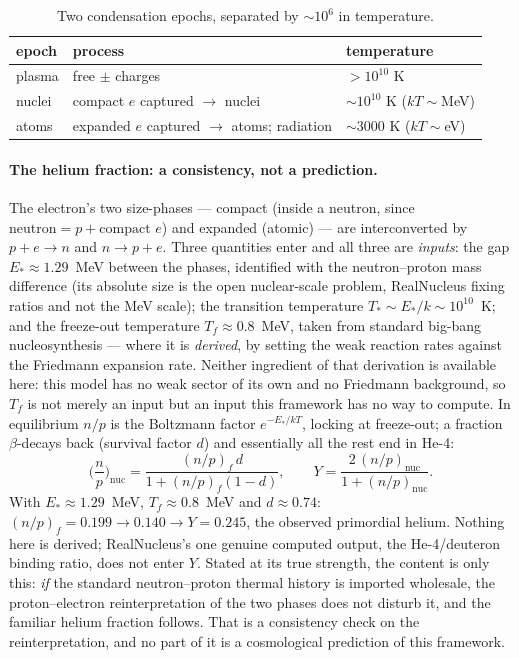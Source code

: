 \documentclass[11pt]{article}
\begin{document}
\begin{table}[h]\centering
\small
\begin{tabular}{@{}lll@{}}
\toprule
epoch & process & temperature \\
\midrule
plasma & free $\pm$ charges & $>10^{10}$ K \\
nuclei & compact $e$ captured $\to$ nuclei & ${\sim}10^{10}$ K ($kT{\sim}$MeV) \\
atoms & expanded $e$ captured $\to$ atoms; radiation & ${\sim}3000$ K ($kT{\sim}$eV) \\
\bottomrule
\end{tabular}
\caption{Two condensation epochs, separated by ${\sim}10^6$ in temperature.}\label{tab:epochs}
\end{table}

\paragraph{The helium fraction: a consistency, not a prediction.} The electron's two size-phases --- compact
(inside a neutron, since $\text{neutron}=p+\text{compact }e$) and expanded (atomic) --- are interconverted by
$p+e\to n$ and $n\to p+e$. Three quantities enter and all three are \emph{inputs}: the gap $E_\ast\approx1.29$~MeV
between the phases, identified with the neutron--proton mass difference (its absolute size is the open
nuclear-scale problem, RealNucleus fixing ratios and not the MeV scale); the transition temperature
$T_\ast\sim E_\ast/k\sim10^{10}$~K; and the freeze-out temperature $T_f\approx0.8$~MeV, taken from standard big-bang
nucleosynthesis --- where it is \emph{derived}, by setting the weak reaction rates against the Friedmann
expansion rate. Neither ingredient of that derivation is available here: this model has no weak sector of its own
and no Friedmann background, so $T_f$ is not merely an input but an input this framework has no way to compute. In equilibrium $n/p$ is the Boltzmann factor $e^{-E_\ast/kT}$, locking at freeze-out; a fraction
$\beta$-decays back (survival factor $d$) and essentially all the rest end in He-4:
\begin{equation}
\Big(\frac{n}{p}\Big)_{\text{nuc}}=\frac{(n/p)_f\,d}{1+(n/p)_f(1-d)},
\qquad
Y=\frac{2\,(n/p)_{\text{nuc}}}{1+(n/p)_{\text{nuc}}} .
\end{equation}
With $E_\ast\approx1.29$~MeV, $T_f\approx0.8$~MeV and $d\approx0.74$: $(n/p)_f=0.199\to0.140\to Y=0.245$, the
observed primordial helium. Nothing here is derived; RealNucleus's one genuine computed output, the He-4/deuteron
binding ratio, does not enter $Y$. Stated at its true strength, the content is only this: \emph{if} the standard
neutron--proton thermal history is imported wholesale, the proton--electron reinterpretation of the two phases
does not disturb it, and the familiar helium fraction follows. That is a consistency check on the
reinterpretation, and no part of it is a cosmological prediction of this framework.
\end{document}
